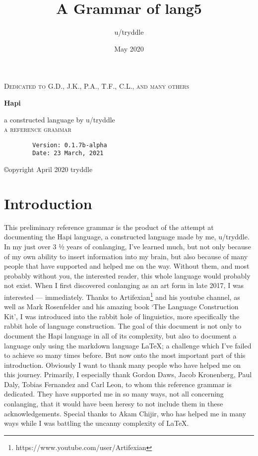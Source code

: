 \documentclass[a4paper, 12pt, oneside]{memoir}
\title{A Grammar of lang5}
\author{u/tryddle}
\date{May 2020}
\makeatletter
\newlength\drop
\newcommand*\titleM{\begingroup%
\setlength\drop{0.08\textheight}
\centering
{\scshape Dedicated to G.D., J.K., P.A., T.F., C.L., and many others\par}
\vspace*{\drop}
   
\vspace*{\drop}
\begin{flushleft}
{\HUGE\bfseries Hapi}\\
\end{flushleft}
\vspace*{\drop}
\vspace*{\drop}
\begin{flushright}
{\LARGE a constructed language by u/tryddle}\\[\baselineskip]
{\scshape a reference grammar}\\[\baselineskip]
{\scshape \@date}\par
\end{flushright}


\endgroup}
\makeatother
\begin{document}
\begin{titlingpage}
\titleM{}
\end{titlingpage}
\pagebreak
{}

\vspace*{\fill}

\begin{center}
    \begin{verbatim}
        Version: 0.1.7b-alpha
        Date: 23 March, 2021
    \end{verbatim}
    ©opyright April 2020 tryddle
\end{center}

\vspace*{\fill}

\restoregeometry

\pagebreak
\setcounter{tocdepth}{4}
\tableofcontents
\newpage 
\listoffigures
\listoftables
\newpage
\printglossaries
\newpage

\chapter{Introduction}
This preliminary reference grammar is the product of the attempt at documenting the Hapi language, a constructed language made by me, u/tryddle. In my just over 3 ½ years of conlanging, I've learned much, but not only because of my own ability to insert information into my brain, but also because of many people that have supported and helped me on the way. Without them, and most probably without you, the interested reader, this whole language would probably not exist. When I first discovered conlanging as an art form in late 2017, I was interested — immediately. Thanks to Artifexian\footnote{https://www.youtube.com/user/Artifexian} and his youtube channel, as well as Mark Rosenfelder and his amazing book `The Language Construction Kit', I was introduced into the rabbit hole of linguistics, more specifically the rabbit hole of language construction. 
The goal of this document is not only to document the Hapi language in all of its complexity, but also to document a language only using the markdown language \LaTeX; a challenge which I've failed to achieve so many times before. 
But now onto the most important part of this introduction. Obviously I want to thank many people who have helped me on this journey. Primarily, I especially thank Gordon Daws, Jacob Kronenberg, Paul Daly, Tobias Fernandez and Carl Leon, to whom this reference grammar is dedicated. They have supported me in so many ways, not all concerning conlanging, that it would have been heresy to not include them in these acknowledgements. Special thanks to Akam Chijir, who has helped me in many ways while I was battling the uncanny complexity of \LaTeX.
\end{document}

